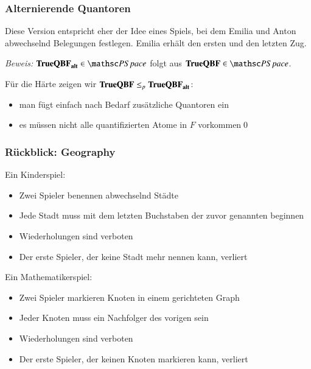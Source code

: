 \documentclass[aspectratio=1610,onlymath]{beamer}
\begin{document}
\begin{frame}\frametitle{Alternierende Quantoren}



Diese Version entspricht eher der Idee eines Spiels, bei dem Emilia und Anton abwechselnd
Belegungen festlegen. Emilia erhält den ersten und den letzten Zug.\bigskip\pause


\pause\emph{Beweis:} $\Slang{TrueQBF}_{\Slang{alt}}\in\PSpace$ folgt aus $\Slang{TrueQBF}\in\PSpace$.\bigskip

Für die Härte zeigen wir $\textbf{\textcolor{black}{TrueQBF}}\leq_p\textbf{\textcolor{black}{TrueQBF}}_{\textbf{\textcolor{black}{alt}}}$:
\begin{itemize}
\item man fügt einfach nach Bedarf zusätzliche Quantoren ein
\item es müssen nicht alle quantifizierten Atome in $F$ vorkommen\qed
\end{itemize}

\end{frame}

\begin{frame}\frametitle{Rückblick: Geography}

\alert{Ein Kinderspiel:}
\begin{itemize}
\item Zwei Spieler benennen abwechselnd Städte
\item Jede Stadt muss mit dem letzten Buchstaben der zuvor genannten beginnen
\item Wiederholungen sind verboten
\item Der erste Spieler, der keine Stadt mehr nennen kann, verliert
\end{itemize}
\smallskip

\alert{Ein Mathematikerspiel:}
\begin{itemize}
\item Zwei Spieler markieren Knoten in einem gerichteten Graph
\item Jeder Knoten muss ein Nachfolger des vorigen sein
\item Wiederholungen sind verboten
\item Der erste Spieler, der keinen Knoten markieren kann, verliert
\end{itemize}
\smallskip

{}

\end{frame}
\end{document}
